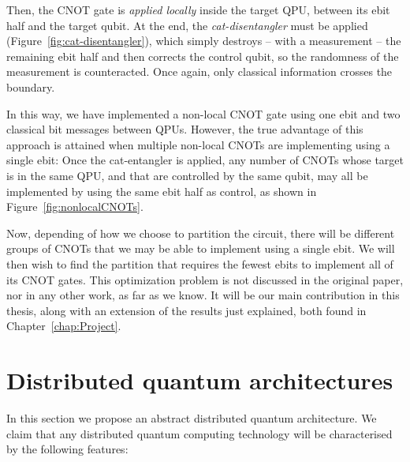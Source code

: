 

Then, the CNOT gate is \textit{applied locally} inside the target QPU, between its ebit half and the target qubit. At the end, the \textit{cat-disentangler} must be applied (Figure~\ref{fig:cat-disentangler}), which simply destroys -- with a measurement -- the remaining ebit half and then corrects the control qubit, so the randomness of the measurement is counteracted. Once again, only classical information crosses the boundary.



In this way, we have implemented a non-local CNOT gate using one ebit and two classical bit messages between QPUs. However, the true advantage of this approach is attained when multiple non-local CNOTs are implementing using a single ebit: Once the cat-entangler is applied, any number of CNOTs whose target is in the same QPU, and that are controlled by the same qubit, may all be implemented by using the same ebit half as control, as shown in Figure~\ref{fig:nonlocalCNOTs}.



Now, depending of how we choose to partition the circuit, there will be different groups of CNOTs that we may be able to implement using a single ebit. We will then wish to find the partition that requires the fewest ebits to implement all of its CNOT gates. This optimization problem is not discussed in the original paper, nor in any other work, as far as we know. It will be our main contribution in this thesis, along with an extension of the results just explained, both found in Chapter~\ref{chap:Project}.


\section{Distributed quantum architectures}
\label{DQC_Architecture} 

In this section we propose an abstract distributed quantum architecture. We claim that any distributed quantum computing technology will be characterised by the following features:

